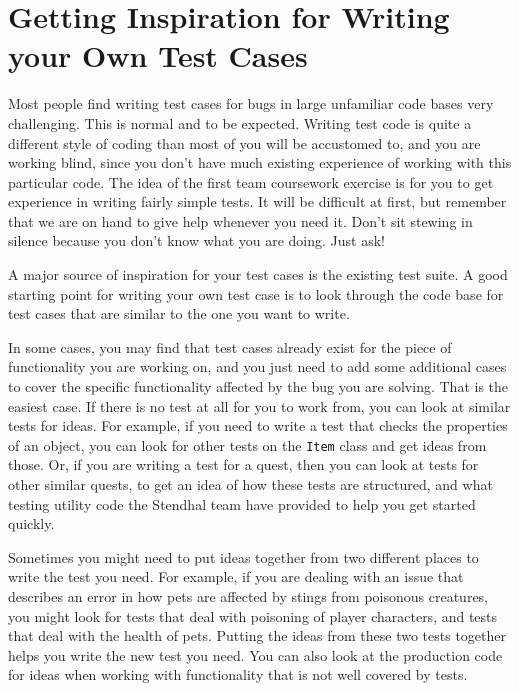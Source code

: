 \documentclass[
]{book}
\begin{document}
\hypertarget{inspirations}{%
\section{Getting Inspiration for Writing your Own Test Cases}\label{inspirations}}

Most people find writing test cases for bugs in large unfamiliar code bases very challenging. This is normal and to be expected. Writing test code is quite a different style of coding than most of you will be accustomed to, and you are working blind, since you don't have much existing experience of working with this particular code. The idea of the first team coursework exercise is for you to get experience in writing fairly simple tests. It will be difficult at first, but remember that we are on hand to give help whenever you need it. Don't sit stewing in silence because you don't know what you are doing. Just ask!

A major source of inspiration for your test cases is the existing test suite. A good starting point for writing your own test case is to look through the code base for test cases that are similar to the one you want to write.

In some cases, you may find that test cases already exist for the piece of functionality you are working on, and you just need to add some additional cases to cover the specific functionality affected by the bug you are solving. That is the easiest case. If there is no test at all for you to work from, you can look at similar tests for ideas. For example, if you need to write a test that checks the properties of an object, you can look for other tests on the \texttt{Item} class and get ideas from those. Or, if you are writing a test for a quest, then you can look at tests for other similar quests, to get an idea of how these tests are structured, and what testing utility code the Stendhal team have provided to help you get started quickly.

Sometimes you might need to put ideas together from two different places to write the test you need. For example, if you are dealing with an issue that describes an error in how pets are affected by stings from poisonous creatures, you might look for tests that deal with poisoning of player characters, and tests that deal with the health of pets. Putting the ideas from these two tests together helps you write the new test you need. You can also look at the production code for ideas when working with functionality that is not well covered by tests.
\end{document}
